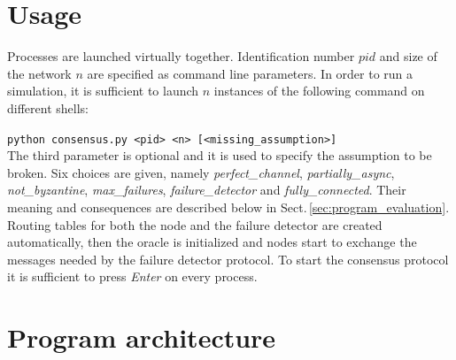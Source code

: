 \documentclass[a4paper]{article}
\begin{document}
\section{Usage} %
\label{sec:usage}

Processes are launched virtually together. Identification number $pid$ and size of the network $n$ are specified as command line parameters. In order to run a simulation, it is sufficient to launch $n$ instances of the following command on different shells:

\verb|python consensus.py <pid> <n> [<missing_assumption>]|
\\

The third parameter is optional and it is used to specify the assumption to be broken. Six choices are given, namely \emph{perfect\_channel}, \emph{partially\_async}, \emph{not\_byzantine}, \emph{max\_failures}, \emph{failure\_detector} and \emph{fully\_connected}. Their meaning and consequences are described below in Sect.\,\ref{sec:program_evaluation}.\newline
Routing tables for both the node and the failure detector are created automatically, then the oracle is initialized and nodes start to exchange the messages needed by the failure detector protocol. To start the consensus protocol it is sufficient to press \emph{Enter} on every process.


\section{Program architecture} %
\label{sec:program_architecture}
\end{document}
